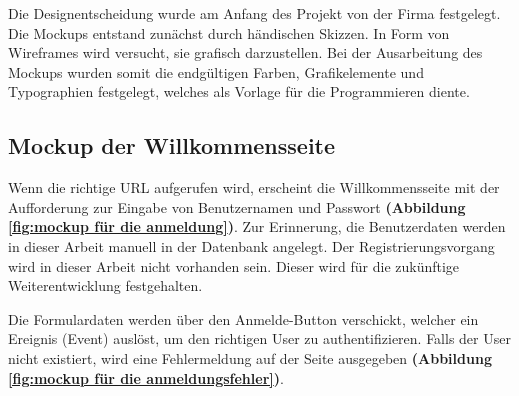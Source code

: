 Die Designentscheidung wurde am Anfang des Projekt von der Firma festgelegt. Die Mockups entstand zunächst durch händischen Skizzen. In Form von Wireframes wird versucht, sie grafisch darzustellen. Bei der Ausarbeitung des Mockups wurden somit die endgültigen Farben, Grafikelemente und Typographien festgelegt, welches als Vorlage für die Programmieren diente.

\subsection{Mockup der Willkommensseite}
\label{subsec:mockup der willkommensseite}
Wenn die richtige URL aufgerufen wird, erscheint die Willkommensseite mit der Aufforderung zur Eingabe von Benutzernamen und Passwort \textbf{(Abbildung \ref{fig:mockup für die anmeldung})}. Zur Erinnerung, die Benutzerdaten werden in dieser Arbeit manuell in der Datenbank angelegt. Der Registrierungsvorgang wird in dieser Arbeit nicht vorhanden sein. Dieser wird für die zukünftige Weiterentwicklung festgehalten.\bigskip

Die Formulardaten werden über den Anmelde-Button verschickt, welcher ein Ereignis (Event) auslöst, um den richtigen User zu authentifizieren. Falls der User nicht existiert, wird eine Fehlermeldung auf der Seite ausgegeben \textbf{(Abbildung \ref{fig:mockup für die anmeldungsfehler})}.\bigskip

